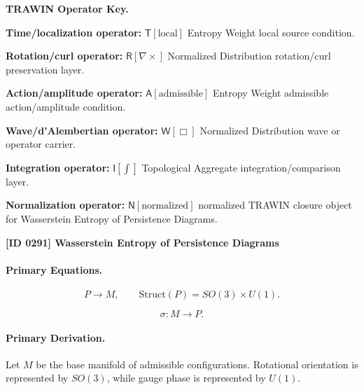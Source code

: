 \par\vspace{0.45\baselineskip}
\noindent\begin{minipage}[t]{\linewidth}
\begingroup
\small
\raggedright
\textbf{TRAWIN Operator Key.}\par
\noindent\textbf{Time/localization operator:} $\mathsf{T}\!\left[\mathrm{local}\right]$ Entropy Weight local source condition.\par
\noindent\textbf{Rotation/curl operator:} $\mathsf{R}\!\left[\nabla\times\right]$ Normalized Distribution rotation/curl preservation layer.\par
\noindent\textbf{Action/amplitude operator:} $\mathsf{A}\!\left[\mathrm{admissible}\right]$ Entropy Weight admissible action/amplitude condition.\par
\noindent\textbf{Wave/d'Alembertian operator:} $\mathsf{W}\!\left[\Box\right]$ Normalized Distribution wave or operator carrier.\par
\noindent\textbf{Integration operator:} $\mathsf{I}\!\left[\int\right]$ Topological Aggregate integration/comparison layer.\par
\noindent\textbf{Normalization operator:} $\mathsf{N}\!\left[\mathrm{normalized}\right]$ normalized TRAWIN closure object for Wasserstein Entropy of Persistence Diagrams.\par
\endgroup
\end{minipage}

\clearpage
\noindent\textbf{[ID 0291] Wasserstein Entropy of Persistence Diagrams}\par
\vspace{0.35em}
\paragraph{Primary Equations.}
\begin{equation}
P \longrightarrow M,
\qquad
\mathrm{Struct}(P)=SO(3)\times U(1).
\end{equation}

\begin{equation}
\sigma:M\longrightarrow P.
\end{equation}

\paragraph{Primary Derivation.}
Let $M$ be the base manifold of admissible configurations. Rotational orientation is represented by $SO(3)$, while gauge phase is represented by $U(1)$.


